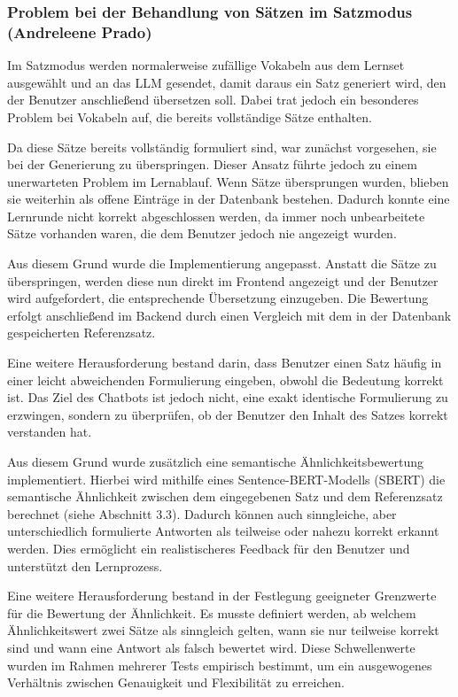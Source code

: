 \subsubsection{Problem bei der Behandlung von Sätzen im Satzmodus (Andreleene Prado)}
Im Satzmodus werden normalerweise zufällige Vokabeln aus dem Lernset ausgewählt und an das LLM gesendet, damit daraus ein Satz generiert wird, den der Benutzer anschließend übersetzen soll. 
Dabei trat jedoch ein besonderes Problem bei Vokabeln auf, die bereits vollständige Sätze enthalten.

Da diese Sätze bereits vollständig formuliert sind, war zunächst vorgesehen, sie bei der Generierung zu überspringen. 
Dieser Ansatz führte jedoch zu einem unerwarteten Problem im Lernablauf. 
Wenn Sätze übersprungen wurden, blieben sie weiterhin als offene Einträge in der Datenbank bestehen. 
Dadurch konnte eine Lernrunde nicht korrekt abgeschlossen werden, da immer noch unbearbeitete Sätze vorhanden waren, die dem Benutzer jedoch nie angezeigt wurden.

Aus diesem Grund wurde die Implementierung angepasst. 
Anstatt die Sätze zu überspringen, werden diese nun direkt im Frontend angezeigt und der Benutzer wird aufgefordert, die entsprechende Übersetzung einzugeben. 
Die Bewertung erfolgt anschließend im Backend durch einen Vergleich mit dem in der Datenbank gespeicherten Referenzsatz.

Eine weitere Herausforderung bestand darin, dass Benutzer einen Satz häufig in einer leicht abweichenden Formulierung eingeben, obwohl die Bedeutung korrekt ist. 
Das Ziel des Chatbots ist jedoch nicht, eine exakt identische Formulierung zu erzwingen, sondern zu überprüfen, ob der Benutzer den Inhalt des Satzes korrekt verstanden hat.

Aus diesem Grund wurde zusätzlich eine semantische Ähnlichkeitsbewertung implementiert. 
Hierbei wird mithilfe eines Sentence-BERT-Modells (SBERT) die semantische Ähnlichkeit zwischen dem eingegebenen Satz und dem Referenzsatz berechnet (siehe Abschnitt 3.3). 
Dadurch können auch sinngleiche, aber unterschiedlich formulierte Antworten als teilweise oder nahezu korrekt erkannt werden. 
Dies ermöglicht ein realistischeres Feedback für den Benutzer und unterstützt den Lernprozess.

Eine weitere Herausforderung bestand in der Festlegung geeigneter Grenzwerte für die Bewertung der Ähnlichkeit. 
Es musste definiert werden, ab welchem Ähnlichkeitswert zwei Sätze als sinngleich gelten, wann sie nur teilweise korrekt sind und wann eine Antwort als falsch bewertet wird. 
Diese Schwellenwerte wurden im Rahmen mehrerer Tests empirisch bestimmt, um ein ausgewogenes Verhältnis zwischen Genauigkeit und Flexibilität zu erreichen.

